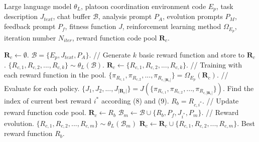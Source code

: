 \documentclass[lettersize,journal]{IEEEtran}
\begin{document}
\renewcommand{\thealgorithm}{1} %
    \begin{algorithm}
        \caption{Platoon Coordination Reward Design} %
        \begin{algorithmic}[1] 
            \Require Large language model $\theta_L$, platoon coordination environment code $E_p$, task description $J_{text}$, chat buffer $\mathcal{B}$, analysis prompt $P_A$, evolution prompts $P_{M}$, feedback prompt $P_{f}$, fitness function $J$, reinforcement learning method $\Omega_{E_p}$, iteration number $N_{iter}$, reward function code pool $\textbf{R}_c$.

            \State $\textbf{R}_c \leftarrow \emptyset$.
            \State $\mathcal{B}= \{E_p,J_{text},P_A\}$.
            \State // Generate $k$ basic reward function and store to $\textbf{R}_c$.
            \State $\{R_{c,1},R_{c,2},...,R_{c,k}\} \sim \theta_L(\mathcal{B})$.
            \State $\textbf{R}_c \leftarrow \{R_{c,1},R_{c,2},...,R_{c,k}\}$.
                \State // Training with each reward function in the pool.
                \State $\{\pi_{R_{c,1}},\pi_{R_{c,2}},...,\pi_{R_{c,|\textbf{R}_c|}}\} = \Omega_{E_p}(\textbf{R}_c)$.
                \State // Evaluate for each policy.
                \State $\{J_1,J_2,...,J_{|\textbf{R}_c|}\} = J(\{\pi_{R_{c,1}},\pi_{R_{c,2}},...,\pi_{R_{c,|\textbf{R}_c|}}\})$.
                \State Find the index of current best reward $i^*$ according (8) and (9).
                \State $R_b = R_{c,i^*}$.
                \State // Update reward function code pool.
                \State $\textbf{R}_c \leftarrow R_{b}$
                    \State $\mathcal{B}_m \leftarrow \mathcal{B} \cup \{R_{b}, P_{f}, J_{i^*}, P_m\}$.
                    \State // Reward evolution.
                    \State $\{R_{c,1},R_{c,2},...,R_{c,m}\} \sim \theta_L(\mathcal{B}_m)$
                    \State $\textbf{R}_c \leftarrow \textbf{R}_c \cup \{R_{c,1},R_{c,2},...,R_{c,m}\}$.
                \EndFor
            \EndFor
            \Ensure Best reward function $R_{b}$.
        \end{algorithmic}
    \end{algorithm}
    
\end{document}

